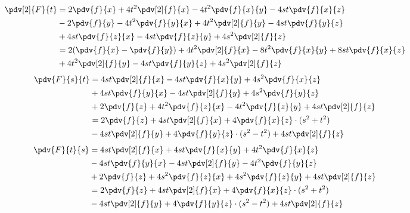 \documentclass[12pt,a4paper,reqno]{article}
\begin{document}
	\begin{equation}
		\begin{split}
			\pdv[2]{F}{t} &= 2\pdv{f}{x}+4t^{2}\pdv[2]{f}{x}-4t^{2}\pdv{f}{x}{y}-4st\pdv{f}{x}{z}\\
						  &-2\pdv{f}{y}-4t^{2}\pdv{f}{y}{x}+4t^{2}\pdv[2]{f}{y}-4st\pdv{f}{y}{z}\\
						  &+4st\pdv{f}{z}{x}-4st\pdv{f}{z}{y}+4s^{2}\pdv[2]{f}{z}\\
						  &=2(\pdv{f}{x}-\pdv{f}{y})+4t^{2}\pdv[2]{f}{x}-8t^{2}\pdv{f}{x}{y}+8st\pdv{f}{x}{z}\\
						  &+4t^{2}\pdv[2]{f}{y}-4st\pdv{f}{y}{z}+4s^{2}\pdv[2]{f}{z}
		\end{split}
	\end{equation}
	\begin{equation}
		\begin{split}
			\pdv{F}{s}{t} &= 4st\pdv[2]{f}{x}-4st\pdv{f}{x}{y}+4s^{2}\pdv{f}{x}{z}\\
						  &+4st\pdv{f}{y}{x}-4st\pdv[2]{f}{y}+4s^{2}\pdv{f}{y}{z}\\
						  &+2\pdv{f}{z}+4t^{2}\pdv{f}{z}{x}-4t^{2}\pdv{f}{z}{y}+4st\pdv[2]{f}{z}\\
						  &=2\pdv{f}{z}+4st\pdv[2]{f}{x}+4\pdv{f}{x}{z}\cdot (s^{2}+t^{2})\\
						  &-4st\pdv[2]{f}{y}+4\pdv{f}{y}{z}\cdot  (s^{2}-t^{2})+4st\pdv[2]{f}{z}
		\end{split}
	\end{equation}
	\begin{equation}
		\begin{split}
			\pdv{F}{t}{s} &= 4st\pdv[2]{f}{x}+4st\pdv{f}{x}{y}+4t^{2}\pdv{f}{x}{z}\\
						  &-4st\pdv{f}{y}{x}-4st\pdv[2]{f}{y}-4t^{2}\pdv{f}{y}{z}\\
						  &+2\pdv{f}{z}+4s^{2}\pdv{f}{z}{x}+4s^{2}\pdv{f}{z}{y}+4st\pdv[2]{f}{z}\\
						  &= 2\pdv{f}{z}+4st\pdv[2]{f}{x}+4\pdv{f}{x}{z}\cdot (s^{2}+t^{2})\\
						  &-4st\pdv[2]{f}{y}+4\pdv{f}{y}{z}\cdot (s^{2}-t^{2})+4st\pdv[2]{f}{z}
		\end{split}
	\end{equation}
	
\end{document}

